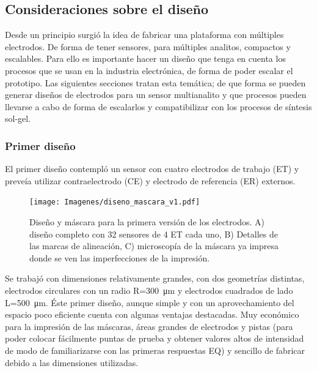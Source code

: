   		\subsection{Consideraciones sobre el diseño}\label{sec:diseno}

			 Desde un principio surgió la idea de fabricar una plataforma con múltiples electrodos. De forma de tener sensores, para múltiples analitos, compactos y escalables. Para ello es importante hacer un diseño que tenga en cuenta los procesos que se usan en la industria electrónica, de forma de poder escalar el prototipo. Las siguientes secciones tratan esta temática; de que forma se pueden generar diseños de electrodos para un sensor multianalito y que procesos pueden llevarse a cabo de forma de escalarlos y compatibilizar con los procesos de síntesis sol-gel.

		 \subsubsection{Primer diseño}

		     El primer diseño contempló un sensor con cuatro electrodos de trabajo (ET) y preveía utilizar contraelectrodo (CE) y electrodo de referencia (ER) externos. 

		    	\begin{figure}[th!]
		 	       	\texttt{[image: Imagenes/diseno\_mascara\_v1.pdf]}
 		       		\caption[Primer diseño y máscara de los sensores]{Diseño y máscara para la primera versión de los electrodos. A) diseño completo con 32 sensores de 4 ET cada uno, B) Detalles de las marcas de alineación, C) microscopía de la máscara ya impresa donde se ven las imperfecciones de la impresión.}
 		         	\label{fig:diseno_mascara_v1}
 		     		\end{figure}
 		 	 \pagebreak
 		     		
		      Se trabajó con dimensiones relativamente grandes, con dos geometrías distintas, electrodos circulares con un radio R=\SI{300}{\um} y electrodos cuadrados de lado L=\SI{500}{\um}. Éste primer diseño, aunque simple y con un aprovechamiento del espacio poco eficiente cuenta con algunas ventajas destacadas. Muy económico para la impresión de las máscaras, áreas grandes de electrodos y pistas (para poder colocar fácilmente puntas de prueba y obtener valores altos de intensidad de modo de familiarizarse con las primeras respuestas EQ) y sencillo de fabricar debido a las dimensiones utilizadas.
		
